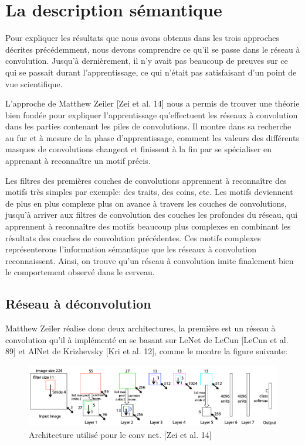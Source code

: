 \section{La description sémantique}

	Pour expliquer les résultats que nous avons obtenus dans les trois approches décrites précédemment, nous devons comprendre ce qu'il se passe dans le réseau à convolution. Jusqu’à dernièrement, il n'y avait pas beaucoup de preuves sur ce qui se passait durant l'apprentissage, ce qui n’était pas satisfaisant d'un point de vue scientifique.

	L'approche de Matthew Zeiler [Zei et al. 14] nous a permis de trouver une théorie bien fondée pour expliquer l'apprentissage qu'effectuent les réseaux à convolution dans les parties contenant les piles de convolutions. Il montre dans sa recherche au fur et à mesure de la phase d'apprentissage, comment les valeurs des différents masques de convolutions changent et finissent à la fin par se spécialiser en apprenant à reconnaître un motif précis.
	
	Les filtres des premières couches de convolutions apprennent à reconnaître des motifs très simples par exemple: des traits, des coins, etc.	Les motifs deviennent de plus en plus complexe plus on avance à travers les couches de convolutions, jusqu'à arriver aux filtres de convolution des couches les profondes du réseau, qui apprennent à reconnaître des motifs beaucoup plus complexes en combinant les résultats des couches de convolution précédentes. Ces motifs complexes représenterons l'information sémantique que les réseaux à convolution reconnaissent.
Ainsi, on trouve qu'un réseau à convolution imite finalement bien le comportement observé dans le cerveau.

\subsection{Réseau à déconvolution}

	Matthew Zeiler réalise donc deux architectures, la première est un réseau à convolution qu'il à implémenté en se basant sur LeNet de LeCun [LeCun et al. 89] et AlNet de Krizhevsky [Kri et al. 12], comme le montre la figure suivante:

\begin{figure}[H]
	\centering
		\includegraphics[width=5in]{Figures/arch.png}
	\caption[Res]{Architecture utilisé pour le conv net. [Zei et al. 14]}
	\label{fig:Electron}
\end{figure}

